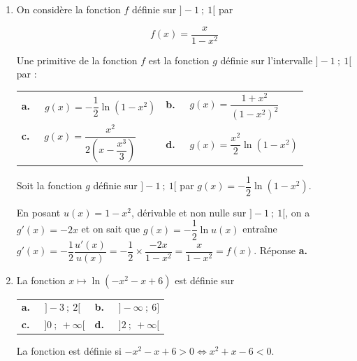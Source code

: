 \begin{enumerate}
Sur $\R_{+}$, $g$ est dérivable et sur cet intervalle, $f'(x) = \ln (x) + x \times \dfrac{1}{x} - 2x = \ln (x) - 2x + 1$.

Puis $f''(x) = \dfrac{1}{x} - 2$.

On a donc $f''(x) = 0 \iff \dfrac{1}{x} - 2 = 0 \iff \dfrac{1}{x} = 2 \iff x = \dfrac{1}{2}$.

Sur $]0~;~+ \infty[$, \: $f$ a un seul point d'inflexion d'abscisse $\dfrac{1}{2}$. Réponse \textbf{c.}

\item On considère la fonction $f$ définie sur $]- 1~;~1[$ par

\[f(x) = \dfrac{x}{1 - x^2}\]

Une primitive de la fonction $f$ est la fonction $g$ définie sur l'intervalle $] - 1~;~1[$ par :

\begin{center}
\begin{tabularx}{\linewidth}{*{2}{X}}
\textbf{a.~~} $g(x) = - \dfrac12 \ln \left(1 - x^2\right)$&\textbf{b.~~} $g(x) =  \dfrac{1 + x^2}{ \left(1 - x^2\right)^2}$\\
\textbf{c.~~} $g(x)= \dfrac{x^2}{2\left(x - \dfrac{x^3}{3}\right)}$&\textbf{d.~~} $g(x) = \dfrac{x^2}{2}\ln \left(1 - x^2\right)$
\end{tabularx}
\end{center}

Soit la fonction $g$ définie sur $] - 1~;~1[$ par $g(x) = - \dfrac12 \ln \left(1 - x^2\right)$.

En posant $u(x) = 1 - x^2$, dérivable et non nulle sur $] - 1~;~1[$, on a $g'(x) = - 2x$ et on sait que $g(x) = - \dfrac12\ln u(x)$ entraîne $g'(x) = - \dfrac12\dfrac{u'(x)}{u(x)} = - \dfrac12 \times \dfrac{- 2x}{1 - x^2} = \dfrac{x}{1 - x^2} = f(x)$. Réponse \textbf{a.}
 
\item La  fonction $x \longmapsto  \ln \left(-x^2- x + 6\right)$ est définie sur

\begin{center}
\begin{tabularx}{\linewidth}{*{2}{X}}
\textbf{a.~~} $]- 3~;~2[$&\textbf{b.~~} $]- \infty~;~6]$\\
\textbf{c.~~} $]0~;~+\infty[$&\textbf{d.~~} $]2~;~+\infty[$
\end{tabularx}
\end{center}

La fonction est définie si $- x^2 - x + 6 > 0 \iff x^2 + x - 6 < 0$.


\end{enumerate}
